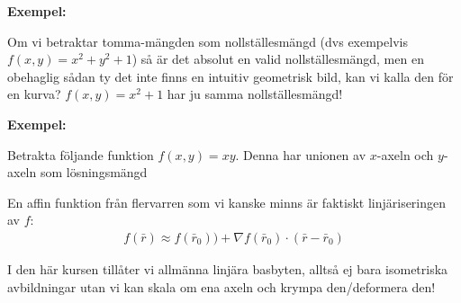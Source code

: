 \par\bigskip
\noindent\textbf{Exempel:}\par
\noindent Om vi betraktar tomma-mängden som nollställesmängd (dvs exempelvis $f(x,y) = x^2+y^2+1$) så är det absolut en valid nollställesmängd, men en obehaglig sådan ty det inte finns en intuitiv geometrisk bild, kan vi kalla den för en kurva? $f(x,y) = x^2+1$ har ju samma nollställesmängd!
\par\bigskip
\noindent\textbf{Exempel:}\par
\noindent Betrakta följande funktion $f(x,y)=xy$. Denna har unionen av $x$-axeln och $y$-axeln som lösningsmängd
\par\bigskip
\noindent En affin funktion från flervarren som vi kanske minns är faktiskt linjäriseringen av $f$:
\begin{equation*}
  \begin{gathered}
    f(\bar{r})\approx f(\bar{r}_0))+\nabla f(\bar{r}_0)\cdot (\bar{r}-\bar{r}_0)
  \end{gathered}
\end{equation*}
\par\bigskip
\noindent I den här kursen tillåter vi allmänna linjära basbyten, alltså ej bara isometriska avbildningar utan vi kan skala om ena axeln och krympa den/deformera den!
\par\bigskip
{}
